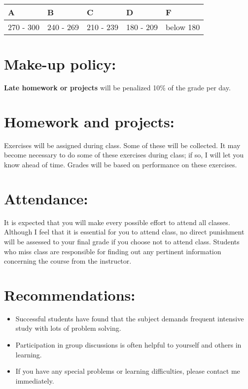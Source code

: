 \documentclass[11pt]{article}
\begin{document}
\begin{center}
\begin{tabular}{lllll}
\hline
 A          &  B          &  C          &  D          &  F          \\
\hline
 270 - 300  &  240 - 269  &  210 - 239  &  180 - 209  &  below 180  \\
\hline
\end{tabular}
\end{center}
\section*{Make-up policy:}
\label{sec-4}

\textbf{Late homework or projects} will be penalized 10\% of the grade per day. 
\section*{Homework and projects:}
\label{sec-5}

Exercises will be assigned during class. Some of these will be collected. It may become necessary to do some of these exercises during class; if so, I will let you know ahead of time. Grades will be based on performance on these exercises. 
\section*{Attendance:}
\label{sec-6}

It is expected that you will make every possible effort to attend all classes. Although I feel that it is essential for you to attend class, no direct punishment will be assessed to your final grade if you choose not to attend class. Students who miss class are responsible for finding out any pertinent information concerning the course from the instructor. 
\section*{Recommendations:}
\label{sec-7}


\begin{itemize}
\item Successful students have found that the subject demands frequent intensive study with lots of problem solving.
\item Participation in group discussions is often helpful to yourself and others in learning.
\item If you have any special problems or learning difficulties, please contact me immediately.
\end{itemize}
\end{document}
